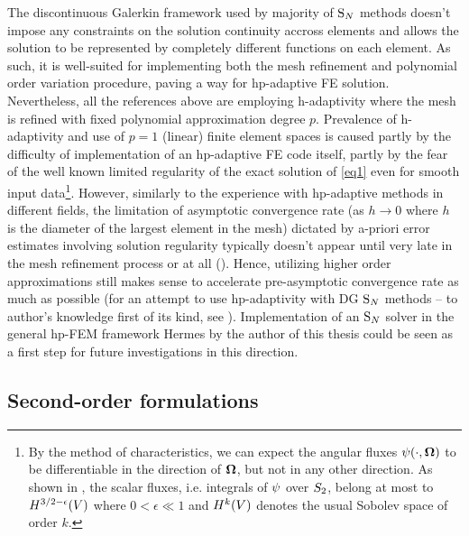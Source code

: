 The discontinuous Galerkin framework used by majority of $\text{S}_{N}$ methods doesn't impose any constraints on the solution
continuity accross elements and allows the solution to be represented by completely different functions on each element.
As such, it is well-suited for implementing both the mesh refinement and polynomial order variation procedure, paving a
way for hp-adaptive FE solution.
Nevertheless, all the references above are employing h-adaptivity where the mesh is refined with fixed polynomial
approximation degree $p$. Prevalence of h-adaptivity and use of $p=1$ (linear) finite element spaces is caused partly
by the difficulty of implementation of an hp-adaptive FE code itself, partly by the fear of the well known limited
regularity of the exact solution of \eqref{eq1} even for smooth input data\footnote{By the method of characteristics, we
can expect the angular fluxes $\psi(\cdot,\mathbf{\Omega})$ to be differentiable in the direction of $\mathbf{\Omega}$, but not in
any other direction. As shown in \cite{Johnson}, the scalar fluxes, i.e. integrals of $\psi$ over $S_2$, belong
at most to $H^{3/2-\epsilon}(V)$ where $0 < \epsilon \ll 1$ and $H^{k}(V)$ denotes the usual Sobolev space of order
$k$.}.
However, similarly to the experience with hp-adaptive methods in different fields, the limitation of asymptotic
convergence rate (as $h\to 0$ where $h$ is the diameter of the largest element in the mesh) dictated by a-priori error
estimates involving solution regularity typically doesn't appear until very late in the mesh refinement process or at
all (\cite{wang2009convergence}). Hence, utilizing higher order approximations still makes sense to accelerate
pre-asymptotic convergence rate as much as possible (for an attempt to use hp-adaptivity with DG $\text{S}_{N}$ methods -- to
author's knowledge first of its kind, see \cite{FournierDGHP}). Implementation of an $\text{S}_{N}$ solver in the general hp-FEM
framework Hermes by the author of this thesis could be seen as a first step for future investigations in this direction.





  

\subsection{Second-order formulations}

